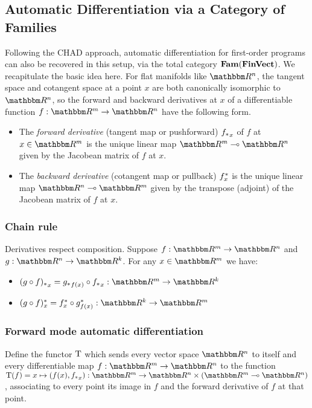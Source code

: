 \subsection{Automatic Differentiation via a Category of Families}

Following the CHAD approach, automatic differentiation for first-order programs can also be recovered in this
setup, via the total category $\mathbf{Fam}(\mathbf{FinVect})$. We recapitulate the basic idea here. For flat manifolds like
$\RR^n$, the tangent space and cotangent space at a point $x$ are both canonically isomorphic to $\RR^n$, so
the forward and backward derivatives at $x$ of a differentiable function $f: \RR^m \to \RR^n$ have the
following form.

\begin{itemize}
\item The \emph{forward derivative} (tangent map or pushforward) ${f_{*}}_x$ of $f$ at $x \in \RR^m$ is the
unique linear map $\RR^m \linearto \RR^n$ given by the Jacobean matrix of $f$ at $x$.
\item The \emph{backward derivative} (cotangent map or pullback) $f^{*}_x$ is the unique linear map
$\RR^n \linearto \RR^m$ given by the transpose (adjoint) of the Jacobean matrix of $f$ at $x$.
\end{itemize}

\subsubsection{Chain rule}

Derivatives respect composition. Suppose $f: \RR^m \to \RR^n$ and $g: \RR^n \to \RR^k$. For any $x \in \RR^m$
we have:

\begin{itemize}
\item $\pushf{(g \comp f)}_x = \pushf{g}_{f(x)} \comp \pushf{f}_x: \RR^m \to \RR^k$
\item $\pullf{(g \comp f)}_x = \pullf{f}_{x} \comp \pullf{g}_{f(x)}: \RR^k \to \RR^m$
\end{itemize}

\subsubsection{Forward mode automatic differentiation}

\begin{definition}
Define the functor $\mathrm{T}$ which sends every vector space $\RR^n$ to itself and every differentiable map
$f: \RR^m \to \RR^n$ to the function $\tangents(f) = x \mapsto (f(x), \pushf{f}_x): \RR^m \to \RR^n \times
(\RR^m \linearto \RR^n)$, associating to every point its image in $f$ and the forward derivative of $f$ at
that point.
\end{definition}

